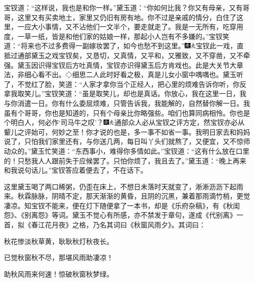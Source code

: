 宝钗道：``这样说，我也是和你一样。''黛玉道：``你如何比我？你又有母亲，又有哥哥，这里又有买卖地土，家里又仍旧有房有地。你不过是亲戚的情分，白住了这里，一应大小事情，又不沾他们一文半个，要走就走了。我是一无所有，吃穿用度，一草一纸，皆是和他们家的姑娘一样，那起小人岂有不多嫌的。''宝钗笑道：``将来也不过多费得一副嫁妆罢了，如今也愁不到这里。''{\includegraphics[width=3mm]{../Images/00004}\includegraphics[width=3mm]{../Images/00012}\footnotesize \kaishu 宝钗此一戏，直抵过通部黛玉之戏宝钗矣，又恳切，又真情，又平和，又雅致，又不穿凿，又不牵强。黛玉因识得宝钗后方吐真情，宝钗亦识得黛玉后方肯戏也。此是大关节大章法，非细心看不出。◇细思二人此时好看之极，真是儿女小窗中喁喁也。}黛玉听了，不觉红了脸，笑道：``人家才拿你当个正经人，把心里的烦难告诉你听，你反拿我取笑儿。''宝钗笑道：``虽是取笑儿，却也是真话。你放心，我在这里一日，我与你消遣一日。你有什么委屈烦难，只管告诉我，我能解的，自然替你解一日。我虽有个哥哥，你也是知道的，只有个母亲比你略强些。咱们也算同病相怜。你也是个明白人，何必作`司马牛之叹'？{\includegraphics[width=3mm]{../Images/00004}\includegraphics[width=3mm]{../Images/00012}\footnotesize \kaishu 通部众人必从宝钗之评方定，然宝钗亦必从颦儿之评始可，何妙之至！}你才说的也是，多一事不如省一事。我明日家去和妈妈说了，只怕我们家里还有，与你送几两，每日叫丫头们就熬了，又便宜，又不惊师动众的。''黛玉忙笑道：``东西事小，难得你多情如此。''宝钗道：``这有什么放在口里的！只愁我人人跟前失于应候罢了。只怕你烦了，我且去了。''黛玉道：``晚上再来和我说句话儿。''宝钗答应着便去了，不在话下。

这里黛玉喝了两口稀粥，仍歪在床上，不想日未落时天就变了，淅淅沥沥下起雨来。秋霖脉脉，阴晴不定，那天渐渐的黄昏，且阴的沉黑，兼着那雨滴竹梢，更觉凄凉。知宝钗不能来，便在灯下随便拿了一本书，却是《乐府杂稿》，有《秋闺怨》、《别离怨》等词。黛玉不觉心有所感，亦不禁发于章句，遂成《代别离》一首，拟《春江花月夜》之格，乃名其词曰《秋窗风雨夕》。其词曰：

秋花惨淡秋草黄，耿耿秋灯秋夜长。

已觉秋窗秋不尽，那堪风雨助凄凉！

助秋风雨来何速！惊破秋窗秋梦绿。

